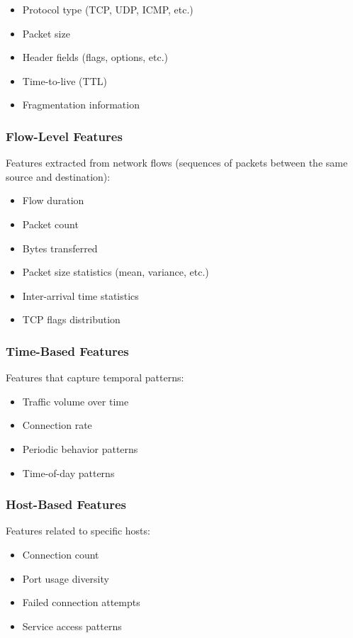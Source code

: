 \begin{itemize}
    \item Protocol type (TCP, UDP, ICMP, etc.)
    \item Packet size
    \item Header fields (flags, options, etc.)
    \item Time-to-live (TTL)
    \item Fragmentation information
\end{itemize}

\subsubsection{Flow-Level Features}
Features extracted from network flows (sequences of packets between the same source and destination):

\begin{itemize}
    \item Flow duration
    \item Packet count
    \item Bytes transferred
    \item Packet size statistics (mean, variance, etc.)
    \item Inter-arrival time statistics
    \item TCP flags distribution
\end{itemize}

\subsubsection{Time-Based Features}
Features that capture temporal patterns:

\begin{itemize}
    \item Traffic volume over time
    \item Connection rate
    \item Periodic behavior patterns
    \item Time-of-day patterns
\end{itemize}

\subsubsection{Host-Based Features}
Features related to specific hosts:

\begin{itemize}
    \item Connection count
    \item Port usage diversity
    \item Failed connection attempts
    \item Service access patterns
\end{itemize}

